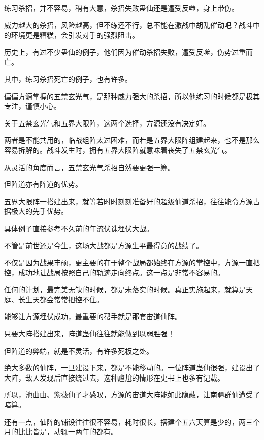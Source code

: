
\begin{this_body}

练习杀招，并不容易，稍有大意，杀招失败蛊仙还是遭受反噬，身上带伤。

威力越大的杀招，风险越高，但不练还不行，总不能在激战中胡乱催动吧？战斗中的环境更是糟糕，会引发对手的强烈阻击。

历史上，有过不少蛊仙的例子，他们因为催动杀招失败，遭受反噬，伤势过重而亡。

其中，练习杀招死亡的例子，也有许多。

偏偏方源掌握的五禁玄光气，是那种威力强大的杀招，所以他练习的时候都是极其专注，谨慎小心。

关于五禁玄光气和五界大限阵，这两个选择，方源还没有决定好。

两者是不能共用的，临战组阵太过困难，而若是五界大限阵组建起来，也不是那么容易拆解的。战斗发生时，拥有五界大限阵就意味着丧失了五禁玄光气。

从灵活的角度而言，五禁玄光气杀招自然要更强一筹。

但阵道亦有阵道的优势。

五界大限阵一搭建出来，就等若时时刻刻准备好的超级仙道杀招，往往能令方源占据极大的先手优势。

具体例子直接参考不久前的年流伏诛埋伏大战。

不管是前世还是今生，这场大战都是方源生平最得意的战绩了。

不仅是因为战果丰硕，更主要的在于整个战局都始终在方源的掌控中，方源一直把控，成功地让战局按照自己的轨迹走向终点。这一点是非常不容易的。

任何的计划，最完美无缺的时候，都是未落实的时候。真正实施起来，就算是天庭、长生天都会常常把控不住。

能够让方源埋伏成功，最重要的帮手就是那套宙道仙阵。

只要大阵搭建出来，阵道蛊仙往往就能做到以弱胜强！

但阵道的弊端，就是不灵活，有许多死板之处。

绝大多数的仙阵，一旦建设下来，都是不能移动的。一位阵道蛊仙很强，建设出了大阵，敌人发现后直接绕过去，这种尴尬的情形在史书上也多有记载。

所以，池曲由、紫薇仙子才感叹，方源的宙道大阵能如此隐蔽，让南疆群仙遭受了暗算。

还有一点，仙阵的铺设往往很不容易，耗时很长，搭建个五六天算是少的，两三个月的比比皆是，动辄一两年的都有。


\end{this_body}
